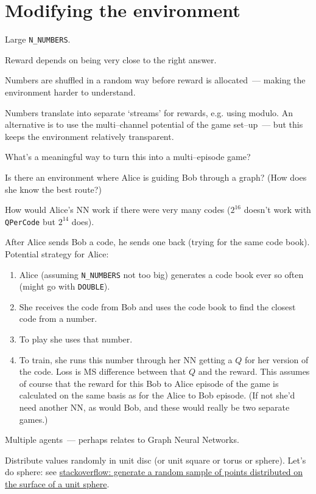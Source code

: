 \documentclass[12pt]{article}
\begin{document}
\section{Modifying the environment}

\begin{enumerate}

\todot Large \verb|N_NUMBERS|.

\todo Reward depends on being very close to the right answer.

\todot Numbers are shuffled in a random way before reward is allocated~--- making the environment harder to understand.

\todo Numbers translate into separate `streams' for rewards, e.g. using modulo.  An alternative is to use the multi--channel potential of the game set--up~--- but this keeps the environment relatively transparent. 

\todo What's a meaningful way to turn this into a multi--episode game?

\todo Is there an environment where Alice is guiding Bob through a graph?  (How does she know the best route?)

\todo How would Alice's NN work if there were very many codes ($2^{16}$ doesn't work with \verb|QPerCode| but $2^{14}$ does).

\todo After Alice sends Bob a code, he sends one back (trying for the same code book). Potential strategy for Alice:

	\begin{enumerate}
		
		\item Alice (assuming \verb|N_NUMBERS| not too big) generates a code book ever so often (might go with \verb|DOUBLE|).
		
		\item She receives the code from Bob and uses the code book to find the closest code from a number.
		
		\item To play she uses that number.
		
		\item To train, she  runs this number through her NN getting a $Q$ for her version of the code.  Loss is MS difference between that $Q$ and the reward.  This assumes of course that the reward for this Bob to Alice episode of the game is calculated on the same basis as for the Alice to Bob episode.  (If not she'd need another NN, as would Bob, and these would really be two separate games.)
		
	\end{enumerate}

\todo Multiple agents~--- perhaps relates to Graph Neural Networks.

\todo Distribute values randomly in unit disc (or unit square or torus or sphere).  Let's do sphere: see  \href{https://stackoverflow.com/questions/33976911/generate-a-random-sample-of-points-distributed-on-the-surface-of-a-unit-sphere#33977530}{stackoverflow: generate a random sample of points distributed on the surface of a unit sphere}.

\end{enumerate}





\end{document}

